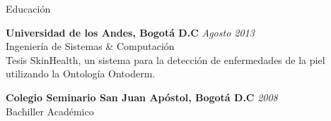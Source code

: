 \documentclass[spanish]{resume} %
\begin{document}

\begin{rSection}{Educaci\'on}

{\bf Universidad de los Andes, Bogot\'a D.C} \hfill {\em Agosto 2013} \\ 
Ingenier\'ia de Sistemas \& Computaci\'on \\
Tesis SkinHealth, un sistema para la detecci\'on de enfermedades de la piel utilizando la Ontolog\'ia Ontoderm.

{\bf Colegio Seminario San Juan Ap\'ostol, Bogot\'a D.C} \hfill {\em 2008} \\ 
Bachiller Acad\'emico

\end{rSection}

\end{document}
